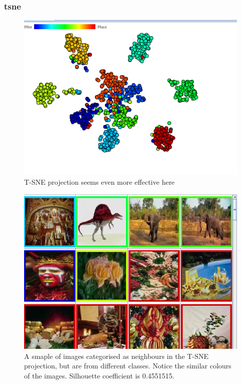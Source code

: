 \documentclass[ 10pt ]{fphw}
\begin{document}
\subsubsection*{tsne}

\begin{center}
\begin{figure}
    \centering
	\includegraphics[width=0.95\columnwidth]{tsne.PNG} 
	\caption{T-SNE projection seems even more effective here}
	\label{fig:tsne}
	\end{figure}
\end{center}

\begin{center}
\begin{figure}[H]
    \centering
	\includegraphics[width=0.95\columnwidth]{tsneConfusion.PNG} 
	\caption{A smaple of images categorised as neighbours in the T-SNE projection, but are from different classes. Notice the similar colours of the images. Silhouette coefficient is 0.4551515.}
	\label{fig:tsneMistakes}
	\end{figure}
\end{center}
\end{document}
